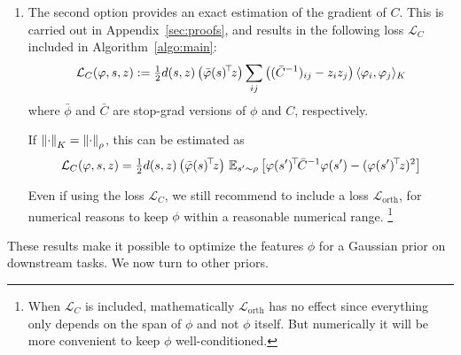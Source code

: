 \documentclass[11pt,a4paper]{article}
\newcommand{\loss}{\mathcal{L}}
\newcommand{\orth}{_\mathrm{orth}}
\begin{document}
\begin{enumerate}
\item The second option provides an exact estimation of the gradient of
$C$. 
This is carried out in Appendix~\ref{sec:proofs}, and results in the
following loss $\loss_C$ included in Algorithm~\ref{algo:main}:
\begin{equation}
\label{eq:lossC}
\loss_C(\phi,s,z)\deq
\tfrac12
d(s,z)\left(\transp{\bar \phi(s)}z\right)
\sum_{ij} \left((\bar C^{-1})_{ij}-z_iz_j\right)\langle
\phi_i,\phi_j\rangle_K
\end{equation}
where $\bar \phi$ and $\bar C$ are stop-grad versions of $\phi$ and $C$,
respectively.

If $\left\lVert\cdot\right\rVert_K=\left\lVert\cdot\right\rVert_\rho$, this can be estimated
as
\begin{equation}
\loss_C(\phi,s,z)=\tfrac12 d(s,z)\left(\transp{\bar \phi(s)}z\right)
\,\E_{s'\sim \rho} \left[\transp{\phi(s')}\bar
C^{-1}\phi(s')-(\transp{\phi(s')}z)^2
\right]
\end{equation}

Even if using the loss $\loss_C$, we still recommend to include a loss
$\loss\orth$, for numerical reasons to keep $\phi$ within a reasonable
numerical range. \footnote{When $\loss_C$ is included, mathematically $\loss\orth$
has no effect since everything only depends on the span of $\phi$ and not
$\phi$ itself. But numerically it will be more convenient to keep $\phi$
well-conditioned.}
\end{enumerate}

These results make it possible to optimize the features $\phi$ for a
Gaussian prior on downstream tasks. We now turn to other priors.
\end{document}

